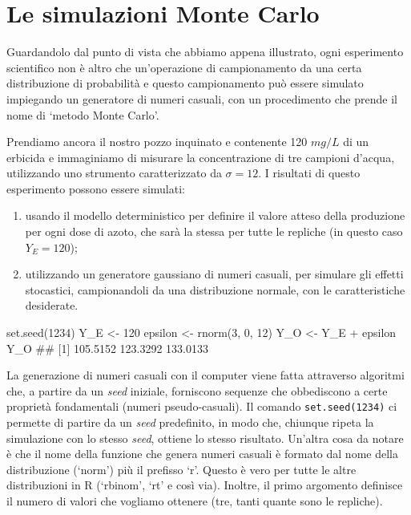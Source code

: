 \documentclass[a4paper,12pt,oneside]{book}
\providecommand{\tightlist}{%
  \setlength{\itemsep}{0pt}\setlength{\parskip}{0pt}}
\newenvironment{Shaded}{\begin{snugshade}}{\end{snugshade}}
\newcommand{\DecValTok}[1]{#1}
\newcommand{\SpecialCharTok}[1]{#1}
\newcommand{\DocumentationTok}[1]{#1}
\newcommand{\OtherTok}[1]{#1}
\newcommand{\FunctionTok}[1]{#1}
\newcommand{\NormalTok}[1]{#1}
\begin{document}
\hypertarget{le-simulazioni-monte-carlo}{%
\section{Le simulazioni Monte Carlo}\label{le-simulazioni-monte-carlo}}

Guardandolo dal punto di vista che abbiamo appena illustrato, ogni esperimento scientifico non è altro che un'operazione di campionamento da una certa distribuzione di probabilità e questo campionamento può essere simulato impiegando un generatore di numeri casuali, con un procedimento che prende il nome di `metodo Monte Carlo'.

Prendiamo ancora il nostro pozzo inquinato e contenente 120 \(mg/L\) di un erbicida e immaginiamo di misurare la concentrazione di tre campioni d'acqua, utilizzando uno strumento caratterizzato da \(\sigma = 12\). I risultati di questo esperimento possono essere simulati:

\begin{enumerate}
\def\labelenumi{\arabic{enumi}.}
\tightlist
\item
  usando il modello deterministico per definire il valore atteso della produzione per ogni dose di azoto, che sarà la stessa per tutte le repliche (in questo caso \(Y_E = 120\));
\item
  utilizzando un generatore gaussiano di numeri casuali, per simulare gli effetti stocastici, campionandoli da una distribuzione normale, con le caratteristiche desiderate.
\end{enumerate}

\begin{Shaded}
\begin{Highlighting}[]
\FunctionTok{set.seed}\NormalTok{(}\DecValTok{1234}\NormalTok{)}
\NormalTok{Y\_E }\OtherTok{\textless{}{-}} \DecValTok{120}
\NormalTok{epsilon }\OtherTok{\textless{}{-}} \FunctionTok{rnorm}\NormalTok{(}\DecValTok{3}\NormalTok{, }\DecValTok{0}\NormalTok{, }\DecValTok{12}\NormalTok{)}
\NormalTok{Y\_O }\OtherTok{\textless{}{-}}\NormalTok{ Y\_E }\SpecialCharTok{+}\NormalTok{ epsilon}
\NormalTok{Y\_O}
\DocumentationTok{\#\# [1] 105.5152 123.3292 133.0133}
\end{Highlighting}
\end{Shaded}

La generazione di numeri casuali con il computer viene fatta attraverso algoritmi che, a partire da un \emph{seed} iniziale, forniscono sequenze che obbediscono a certe proprietà fondamentali (numeri pseudo-casuali). Il comando \texttt{set.seed(1234)} ci permette di partire da un \emph{seed} predefinito, in modo che, chiunque ripeta la simulazione con lo stesso \emph{seed}, ottiene lo stesso risultato. Un'altra cosa da notare è che il nome della funzione che genera numeri casuali è formato dal nome della distribuzione (`norm') più il prefisso `r'. Questo è vero per tutte le altre distribuzioni in R (`rbinom', `rt' e così via). Inoltre, il primo argomento definisce il numero di valori che vogliamo ottenere (tre, tanti quante sono le repliche).
\end{document}
